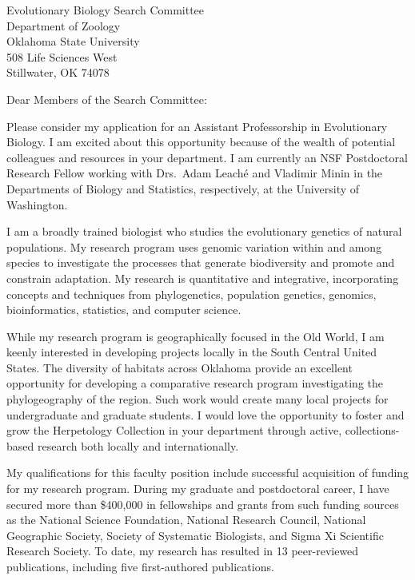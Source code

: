 \documentclass[letterpaper, 10pt]{letter}
\begin{document}
\begin{letter}{Evolutionary Biology Search Committee \\
                     Department of Zoology \\
                     Oklahoma State University \\
                     508 Life Sciences West \\
                     Stillwater, OK 74078}
\opening{Dear Members of the Search Committee:}
Please consider my application for an Assistant Professorship in
Evolutionary Biology.
I am excited about this opportunity because of the wealth of potential
colleagues and resources in your department.
I am currently an NSF Postdoctoral Research Fellow working with Drs.\ Adam
Leach\'{e} and Vladimir Minin in the Departments of Biology and
Statistics, respectively, at the University of Washington.

I am a broadly trained biologist who studies the evolutionary genetics of
natural populations.
My research program uses genomic variation within and among species to
investigate the processes that generate biodiversity and promote and
constrain adaptation.
My research is quantitative and integrative, incorporating concepts and
techniques from phylogenetics, population genetics, genomics,
bioinformatics, statistics, and computer science.

While my research program is geographically focused in the Old World, I am
keenly interested in developing projects locally in the South Central
United States.
The diversity of habitats across Oklahoma provide an excellent opportunity
for developing a comparative research program investigating the
phylogeography of the region.
Such work would create many local projects for undergraduate and graduate
students.
I would love the opportunity to foster and grow the Herpetology Collection
in your department through active, collections-based research both locally
and internationally.

My qualifications for this faculty position include successful acquisition
of funding for my research program.
During my graduate and postdoctoral career, I have secured more than
\$400,000 in fellowships and grants from such funding sources as the 
National Science Foundation,
National Research Council,
National Geographic Society,
Society of Systematic Biologists, and
Sigma Xi Scientific Research Society.
To date, my research has resulted in 13 peer-reviewed publications,
including five first-authored publications.


\end{letter}
\end{document}
